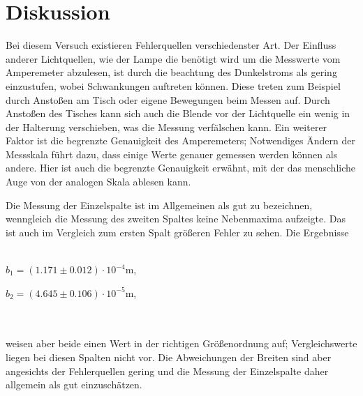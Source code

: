 \section{Diskussion}
\label{sec:Diskussion}
Bei diesem Versuch existieren Fehlerquellen verschiedenster Art. Der Einfluss anderer Lichtquellen, wie der Lampe die benötigt wird um 
die Messwerte vom Amperemeter abzulesen, ist durch die beachtung des Dunkelstroms als gering einzustufen, wobei Schwankungen auftreten können.
Diese treten zum Beispiel durch Anstoßen am Tisch oder eigene Bewegungen beim Messen auf. Durch Anstoßen des Tisches kann sich auch die Blende 
vor der Lichtquelle ein wenig in der Halterung verschieben, was die Messung verfälschen kann. Ein weiterer Faktor ist die begrenzte Genauigkeit
des Amperemeters; Notwendiges Ändern der Messskala führt dazu, dass einige Werte genauer gemessen werden können als andere. Hier ist auch die 
begrenzte Genauigkeit erwähnt, mit der das menschliche Auge von der analogen Skala ablesen kann. 

Die Messung der Einzelspalte ist im Allgemeinen als gut zu bezeichnen, wenngleich die Messung des zweiten Spaltes keine Nebenmaxima aufzeigte.
Das ist auch im Vergleich zum ersten Spalt größeren Fehler zu sehen. Die Ergebnisse
\\ \\
 \centerline{$b_1 = (1.171 \pm 0.012) \cdot 10^{-4}$m,}
 \centerline{$b_2 = (4.645\pm 0.106) \cdot 10^{-5}$m,}
\\ \\
weisen aber beide einen Wert in der richtigen Größenordnung auf; Vergleichswerte liegen bei diesen Spalten nicht vor.
Die Abweichungen der Breiten sind aber angesichts der Fehlerquellen gering und die Messung der Einzelspalte daher allgemein als gut einzuschätzen.

